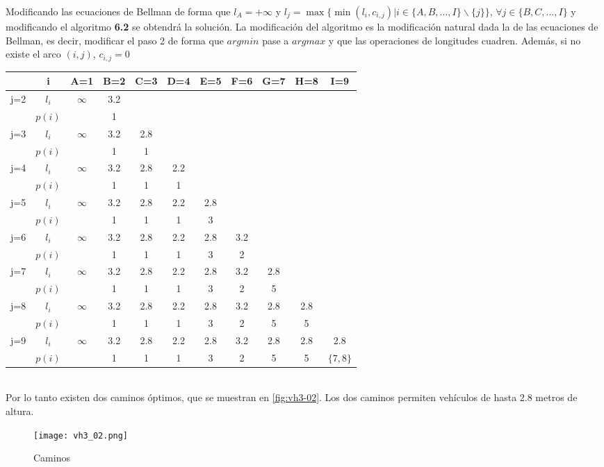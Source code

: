 \documentclass[12pt, oneside, a4paper]{article}
\begin{document}
Modificando las ecuaciones de Bellman de forma que $l_{A}=+\infty$ y
$l_{j}=\max\{\min(l_{i},c_{i,j}) | i\in\{A,B,...,I\}\backslash
\{j\}\}$, $\forall j\in\{B,C,...,I\}$ y modificando el algoritmo
\textbf{6.2} se obtendrá la solución. La modificación del algoritmo es
la modificación natural dada la de las ecuaciones de Bellman, es
decir, modificar el paso 2 de forma que $argmin$ pase a $argmax$ y que
las operaciones de longitudes cuadren. Además, si no existe el arco
$(i,j)$, $c_{i,j}=0$

\begin{tabular}{| c | c | c | c | c | c | c | c | c | c | c |}
\hline
& i & A=1 & B=2 & C=3 & D=4 & E=5 & F=6 & G=7 & H=8 & I=9\\
\hline
\multirow{2}{*}{j=2} & $l_{i}$ & $\infty$ &  3.2 & & & & & & & \\
    & $p(i)$ &  & 1 & & & & & & &\\ 
\hline\hline
\multirow{2}{*}{j=3} & $l_{i}$ & $\infty$ &  3.2 & 2.8 & & & & & & \\
    & $p(i)$ &  & 1 & 1 & & & & & &\\ 
\hline\hline
\multirow{2}{*}{j=4} & $l_{i}$ & $\infty$ &  3.2 & 2.8 & 2.2 & & & & & \\
    & $p(i)$ &  & 1 & 1 & 1 & & & & &\\ 
\hline\hline
\multirow{2}{*}{j=5} & $l_{i}$ & $\infty$ &  3.2 & 2.8 & 2.2 & 2.8 & & & & \\
    & $p(i)$ &  & 1 & 1 & 1 & 3 & & & &\\ 
\hline\hline
\multirow{2}{*}{j=6} & $l_{i}$ & $\infty$ &  3.2 & 2.8 & 2.2 & 2.8 & 3.2 & & & \\
    & $p(i)$ &  & 1 & 1 & 1 & 3 & 2 & & &\\ 
\hline\hline
\multirow{2}{*}{j=7} & $l_{i}$ & $\infty$ &  3.2 & 2.8 & 2.2 & 2.8 &
3.2 & 2.8 & & \\
    & $p(i)$ &  & 1 & 1 & 1 & 3 & 2 & 5 & &\\ 
\hline\hline
\multirow{2}{*}{j=8} & $l_{i}$ & $\infty$ &  3.2 & 2.8 & 2.2 & 2.8 &
3.2 & 2.8 & 2.8 & \\
    & $p(i)$ &  & 1 & 1 & 1 & 3 & 2 & 5 & 5 &\\ 
\hline\hline
\multirow{2}{*}{j=9} & $l_{i}$ & $\infty$ &  3.2 & 2.8 & 2.2 & 2.8 &
3.2 & 2.8 & 2.8 & 2.8 \\
    & $p(i)$ &  & 1 & 1 & 1 & 3 & 2 & 5 & 5 & $\{7,8\}$\\ 
\hline
\end{tabular}
\\
Por lo tanto existen dos caminos óptimos, que se muestran en
\autoref{fig:vh3-02}. Los dos caminos permiten vehículos de hasta 2.8
metros de altura.

\begin{figure}
\centering
\texttt{[image: vh3\_02.png]}
\caption{Caminos}
\label{fig:vh3-02}
\end{figure}
\end{document}
